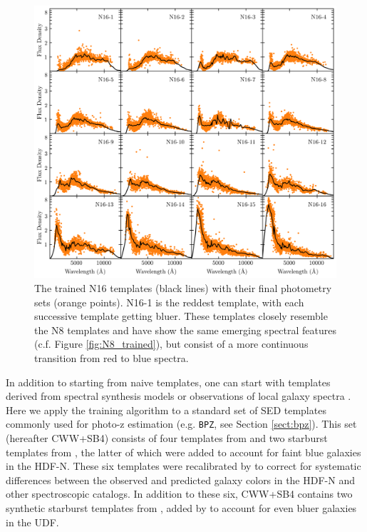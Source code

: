 \documentclass[twocolumn]{aastex63}
\newcommand{\pzcode}[1]{\texttt{#1}}
\newcommand{\bpz}{\pzcode{BPZ}}
\begin{document}
    \begin{figure}
        \centering
        \includegraphics{N16_trained.png}
        \caption{The trained N16 templates (black lines) with their final photometry sets (orange points). N16-1 is the reddest template, with each successive template getting bluer. These templates closely resemble the N8 templates and have show the same emerging spectral features (c.f. Figure \ref{fig:N8_trained}), but consist of a more continuous transition from red to blue spectra.}
        \label{fig:N16_trained}
    \end{figure}

    In addition to starting from naive templates, one can start with templates derived from spectral synthesis models or observations of local galaxy spectra \citep{Budavari2000b, Csabai2000}.
    Here we apply the training algorithm to a standard set of SED templates commonly used for photo-z estimation (e.g. \bpz, see Section \ref{sect:bpz}).
    This set (hereafter CWW+SB4) consists of four templates from \citet{Coleman1980a} and two starburst templates from \citet{Kinney1996a}, the latter of which were added to account for faint blue galaxies in the HDF-N. 
    These six templates were recalibrated by \citet{Benitez2004a} to correct for systematic differences between the observed and predicted galaxy colors in the HDF-N and other spectroscopic catalogs. 
    In addition to these six, CWW+SB4 contains two synthetic starburst templates from \citet{Bruzual2003b}, added by \citet{Coe2006a} to account for even bluer galaxies in the UDF.
\end{document}
